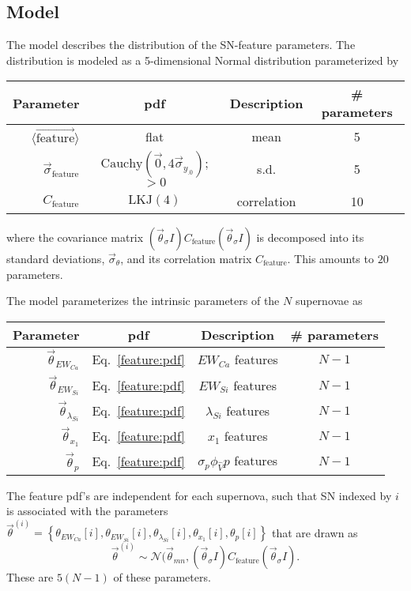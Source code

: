 \documentclass{aastex61}   	%
\begin{document}
\subsection{Model}
The model describes the distribution of the SN-feature parameters.  The distribution is modeled as a
5-dimensional Normal distribution
parameterized by 
\begin{center}
\begin{tabular}{rccc}
\hline
Parameter & pdf & Description & \# parameters\\ \hline
$\langle \overrightarrow{\text{feature}}\rangle$ & flat  &  mean & 5\\
$\vec{\sigma}_{\text{feature}}$ & $\text{Cauchy}(\vec{0},4\vec{\sigma}_{y_{.0}})$; $>0$  &  s.d. & 5\\
$C_{\text{feature}}$ & $\text{LKJ}(4)$ &  correlation & 10\\
\hline
\end{tabular}
\end{center}
where the covariance matrix $(\vec{\theta}_{\sigma}I) C_{\text{feature}}  (\vec{\theta}_{\sigma}I)$ is
decomposed into its standard deviations, $\vec{\sigma}_{\theta}$,
and its correlation matrix $C_{\text{feature}}$.
This amounts to $20$ parameters.

The model parameterizes the intrinsic parameters of the $N$ supernovae as
\begin{center}
\begin{tabular}{rccc}
\hline
Parameter & pdf & Description & \# parameters\\ \hline
$\vec{\theta}_{EW_{Ca}}$ & Eq.~\ref{feature:pdf} & ${EW}_{Ca}$ features & $N-1$ \\
$\vec{\theta}_{EW_{Si}}$ & Eq.~\ref{feature:pdf}& ${EW}_{Si}$ features & $N-1$ \\
$\vec{\theta}_{\lambda_{Si}}$ &Eq.~\ref{feature:pdf}& ${\lambda}_{Si}$ features & $N-1$ \\
$\vec{\theta}_{x_1}$ & Eq.~\ref{feature:pdf}& ${x}_{1}$ features & $N-1$ \\
$\vec{\theta}_{p}$ & Eq.~\ref{feature:pdf}& $\sigma_p\phi_{\hat{V}}  {p} $ features & $N-1$ \\
\hline
\end{tabular}
\end{center}
The feature pdf's are independent for each supernova, such that SN indexed by $i$ is associated with the parameters
$\vec{\theta}^{(i)}=\left\{\theta_{EW_{Ca}}[i], \theta_{EW_{Si}}[i], \theta_{\lambda_{Si}}[i], \theta_{x_1}[i], \theta_{p}[i] \right\}$
that are drawn as
\begin{equation}
\vec{\theta}^{(i)} \sim \mathcal{N}(\vec{\theta}_{\mathit{mn}}, (\vec{\theta}_{\sigma}I) C_{\text{feature}}  (\vec{\theta}_{\sigma}I).
\label{feature:pdf}
\end{equation}
These are $5(N-1)$ of these parameters.
\end{document}

